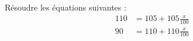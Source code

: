 
\begin{exercice}\label{exoSeconde-0031}

    Résoudre les équations suivantes :
    \begin{subequations}
        \begin{align}
            110&=105+105\frac{ x }{ 100 }\\
            90&=110+110\frac{ x }{ 100 }
        \end{align}
    \end{subequations}
\end{exercice}
